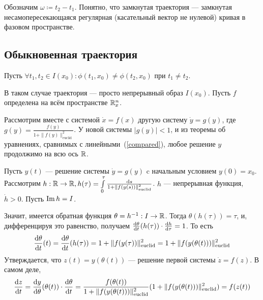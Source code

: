 \documentclass[a4paper]{report}
\begin{document}
    Обозначим $\omega \coloneqq t_2 - t_1$.
    Понятно, что замкнутая траектория --- замкнутая несамопересекающаяся регулярная (касательный вектор не нулевой) кривая в фазовом пространстве.

    \subsection{Обыкновенная траектория}
    Пусть $\forall t_1, t_2 \in I(x_0): \phi(t_1, x_0) \ne \phi(t_2, x_0)$ при $t_1 \ne t_2$.

    В таком случае траектория --- просто непрерывный образ $I(x_0)$.
    \ok
    Пусть $f$ определена на всём пространстве $\mathbb{R}^n_x$.

    Рассмотрим вместе с системой $\dot{x} = f(x)$ другую систему $\dot{y} = g(y)$, где $g(y) = \frac{f(y)}{1 + \|f(y)\|^2_{\text{euclid}}}$.
    У новой системы $|g(y)| < 1$, и из теоремы об уравнениях, сравнимых с линейными~(\cref{compared}), любое решение $y$ продолжимо на всю ось $\mathbb{R}$.

    Пусть $y(t)$ --- решение системы $\dot{y} = g(y)$ c начальным условием $y(0) = x_0$.
    Рассмотрим $h: \mathbb{R} \rightarrow \mathbb{R}, h(\tau) = \int\limits_{0}^{\tau}\frac{\operatorname{d}\! s}{1 + \|f(y(s))\|^2_{\text{euclid}}}$. $h$ --- непрерывная функция, $\dot{h} > 0$.
    Пусть $\operatorname{Im} h = I$.

    Значит, имеется обратная функция $\theta = h^{-1}: I \rightarrow \mathbb{R}$.
    Тогда $\theta(h(\tau)) = \tau$, и, дифференцируя это равенство, получаем $\frac{\operatorname{d}\! \theta}{\operatorname{d}\! t}(h(\tau)) \cdot \frac{\operatorname{d}\! h}{\operatorname{d}\! \tau} = 1$.
    То есть
    \[\frac{\operatorname{d}\!\theta}{\operatorname{d}\! t}(t) = \frac{\operatorname{d}\! \theta}{\operatorname{d}\! t}(h(\tau)) = 1 + \|f(y(\tau))\|^2_{\text{euclid}} = 1 + \|f(y(\theta(t)))\|^2_{\text{euclid}}\]
    Утверждается, что $z(t) = y(\theta(t))$ --- решение первой системы $\dot{z} = f(z)$.
    В самом деле,
    \[\frac{\operatorname{d}\! z}{\operatorname{d}\! t} = \frac{\operatorname{d}\! y}{\operatorname{d}\! \theta}(\theta(t)) \cdot \frac{\operatorname{d}\! \theta}{\operatorname{d}\! t} = \frac{f(\theta(t))}{1 + \|f(y(\theta(t)))\|^2_{\text{euclid}}}(1 + \|f(y(\theta(t)))\|^2_{\text{euclid}}) = f(z(t))\]
\end{document}

